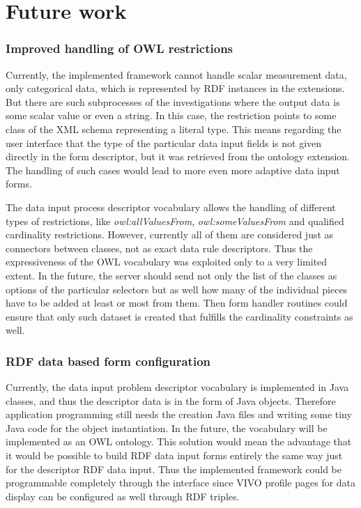\section{Future work}

\subsubsection{Improved handling of OWL restrictions}

Currently, the implemented framework cannot handle scalar measurement data, only categorical data, which is represented by RDF instances in the extensions. But there are such subprocesses of the investigations where the output data is some scalar value or even a string. In this case, the restriction points to some class of the XML schema representing a literal type. This means regarding the user interface that the type of the particular data input fields is not given directly in the form descriptor, but it was retrieved from the ontology extension. The handling of such cases would lead to more even more adaptive data input forms.

The data input process descriptor vocabulary allows the handling of different types of restrictions, like \textit{owl:allValuesFrom}, \textit{owl:someValuesFrom} and qualified cardinality restrictions. However, currently all of them are considered just as connectors between classes, not as exact data rule descriptors. Thus the expressiveness of the OWL vocabulary was exploited only to a very limited extent. In the future, the server should send not only the list of the classes as options of the particular selectors but as well how many of the individual pieces have to be added at least or most from them. Then form handler routines could ensure that only such dataset is created that fulfills the cardinality constraints as well.

\subsubsection{RDF data based form configuration}

Currently, the data input problem descriptor vocabulary is implemented in Java classes, and thus the descriptor data is in the form of Java objects. Therefore application programming still needs the creation Java files and writing some tiny Java code for the object instantiation. In the future, the vocabulary will be implemented as an OWL ontology. This solution would mean the advantage that it would be possible to build RDF data input forms entirely the same way just for the descriptor RDF data input. Thus the implemented framework could be programmable completely through the interface since VIVO profile pages for data display can be configured as well through RDF triples.

